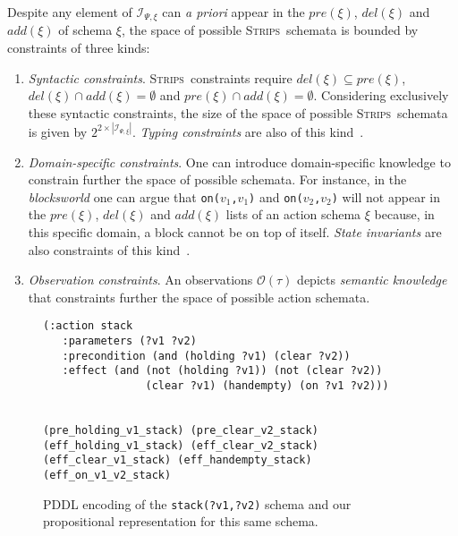 \documentclass{article}
\newcommand{\strips}{\textsc{Strips}}
\begin{document}
Despite any element of ${\mathcal I}_{\Psi,\xi}$ can {\em a priori} appear in the $pre(\xi)$, $del(\xi)$ and $add(\xi)$ of schema $\xi$, the space of possible \strips\ schemata is bounded by constraints of three kinds:
\begin{enumerate}
\item {\em Syntactic constraints}. \strips\ constraints require $del(\xi)\subseteq pre(\xi)$, $del(\xi)\cap add(\xi)=\emptyset$ and $pre(\xi)\cap add(\xi)=\emptyset$. Considering exclusively these syntactic constraints, the size of the space of possible \strips\ schemata is given by $2^{2\times|{\mathcal I}_{\Psi,\xi}|}$. {\em Typing constraints} are also of this kind~\cite{mcdermott1998pddl}. 
\item {\em Domain-specific constraints}. One can introduce domain-specific knowledge to constrain further the space of possible schemata. For instance, in the {\em blocksworld} one can argue that {\small\tt on($v_1$,$v_1$)} and {\small\tt on($v_2$,$v_2$)} will not appear in the $pre(\xi)$, $del(\xi)$ and $add(\xi)$ lists of an action schema $\xi$ because, in this specific domain, a block cannot be on top of itself. {\it State invariants} are also constraints of this kind~\cite{fox1998automatic}. 
\item {\em Observation constraints}. An observations $\mathcal{O}(\tau)$ depicts {\em semantic knowledge} that constraints further the space of possible action schemata.   
\end{enumerate}

\begin{figure}
  \begin{tiny}  
  \begin{verbatim}
(:action stack
   :parameters (?v1 ?v2)
   :precondition (and (holding ?v1) (clear ?v2))
   :effect (and (not (holding ?v1)) (not (clear ?v2))
                (clear ?v1) (handempty) (on ?v1 ?v2)))


(pre_holding_v1_stack) (pre_clear_v2_stack)
(eff_holding_v1_stack) (eff_clear_v2_stack)
(eff_clear_v1_stack) (eff_handempty_stack) (eff_on_v1_v2_stack)
  \end{verbatim}           
  \end{tiny}  
 \caption{\small PDDL encoding of the {\tt\small stack(?v1,?v2)} schema and our propositional representation for this same schema.}
\label{fig:propositional}
\end{figure}
\end{document}
